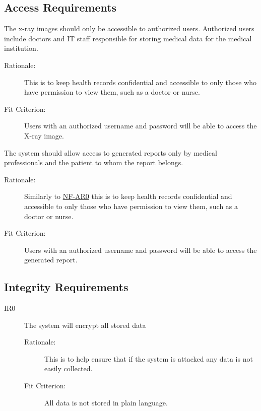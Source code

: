 \documentclass{article}
\begin{document}
\subsection{Access Requirements}
\begin{description}
\hypertarget{AR0}{}
    \item[AR0] The x-ray images should only be accessible to authorized users. Authorized users include doctors and IT staff responsible for storing medical data for the medical institution. 
    \begin{description}
        \item[Rationale:] This is to keep health records confidential and accessible to only those who have permission to view them, such as a doctor or nurse. 
        \item[Fit Criterion:] Users with an authorized username and password will be able to access the X-ray image.
    \end{description}
    \item[AR1] The system should allow access to generated reports only by medical professionals and the patient to whom the report belongs. 
    \begin{description}
        \item[Rationale:] Similarly to \hyperlink{AR0}{NF-AR0} this is to keep health records confidential and accessible to only those who have permission to view them, such as a doctor or nurse. 
        \item[Fit Criterion:] Users with an authorized username and password will be able to access the generated report.
    \end{description}
\end{description}

\subsection{Integrity Requirements}
\begin{description}
    \item[IR0] The system will encrypt all stored data 
    \begin{description}
        \item[Rationale:] This is to help ensure that if the system is attacked any data is not easily collected. 
        \item[Fit Criterion:] All data is not stored in plain language. 
    \end{description}
\end{description}
\end{document}
